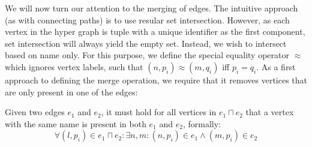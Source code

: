 \documentclass[../Master.tex]{subfiles}
\begin{document}
We will now turn our attention to the merging of edges. The intuitive approach (as with connecting paths) is to use resular set intersection. However, as each vertex in the hyper graph is tuple with a unique identifier as the first component, set intersection will always yield the empty set. Instead, we wish to intersect based on name only. For this purpose, we define the special equality operator $\approx$ which ignores vertex labels, such that $\left(n,p_i\right) \approx \left(m, q_i\right)$ iff $p_i = q_i$. As a first approach to defining the merge operation, we require that it removes vertices that are only present in one of the edges:

\begin{proposition}
	Given two edges $e_1$ and $e_2$, it must hold for all vertices in $e_1 \sqcap e_2$ that a vertex with the same name is present in both $e_1$ and $e_2$, formally:
	\begin{equation*}
		\forall \left(l, p_i\right) \in e_1 \sqcap e_2 : 
		\exists n,m : \left(n, p_i\right) \in e_1 \land \left(m, p_i\right) \in e_2
	\end{equation*}
\end{proposition}
\end{document}
